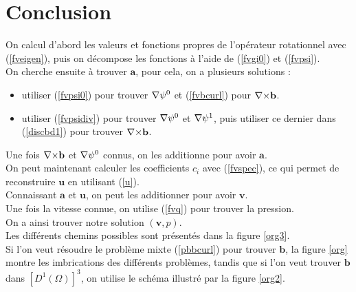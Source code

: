 \section{Conclusion}

On calcul d'abord les valeurs et fonctions propres de l'opérateur rotationnel avec (\ref{fveigen}), puis on décompose les fonctions à l'aide de (\ref{fvgi0}) et (\ref{fvpsi}).\\
On cherche ensuite à trouver $\mathbf{a}$, pour cela, on a plusieurs solutions :
\begin{itemize}
\item utiliser (\ref{fvpsi0}) pour trouver ${\nabla}\psi^0$  et (\ref{fvbcurl}) pour ${\nabla\times} \mathbf{b}$.
\item utiliser (\ref{fvpsidiv}) pour trouver ${\nabla}\psi^0$ et ${\nabla}\psi^1$, puis utiliser ce dernier dans (\ref{discbd1}) pour trouver ${\nabla\times} \mathbf{b}$.
\end{itemize}
Une fois ${\nabla\times} \mathbf{b}$ et ${\nabla}\psi^0$ connus, on les additionne pour avoir $\mathbf{a}$.\\
On peut maintenant calculer les coefficients $c_i$ avec (\ref{fvspec}), ce qui permet de reconstruire $\mathbf{u}$ en utilisant (\ref{u}).\\
Connaissant $\mathbf{a}$ et $\mathbf{u}$, on peut les additionner pour avoir $\mathbf{v}$.\\
Une fois la vitesse connue, on utilise (\ref{fvq}) pour trouver la pression.\\

On a ainsi trouver notre solution $(\mathbf{v},p)$.\\
Les différents chemins possibles sont présentés dans la figure \ref{org3}.\\
Si l'on veut résoudre le problème mixte (\ref{pbbcurl}) pour trouver $\mathbf{b}$, la figure \ref{org} montre les imbrications des différents problèmes, tandis que si l'on veut trouver $\mathbf{b}$ dans $[D^1(\Omega)]^3$, on utilise le schéma illustré par la figure \ref{org2}.\\

